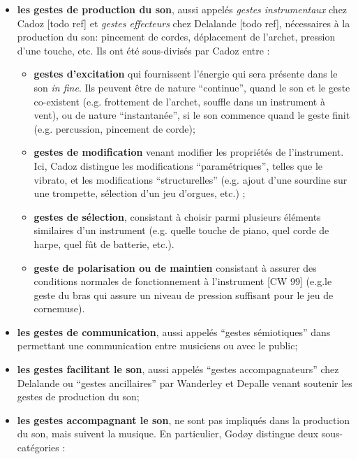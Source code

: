 \vspace{-1em}
\begin{itemize}[noitemsep]
\item \textbf{les gestes de production du son}, aussi appelés \textit{gestes instrumentaux} chez Cadoz [todo ref] et \textit{gestes effecteurs} chez Delalande [todo ref], nécessaires à la production du son: pincement de cordes, déplacement de l'archet, pression d'une touche, etc. Ils ont été sous-divisés par Cadoz \cite{cadoz_instrumental_1988} entre :
	\vspace{-0.5em}
	\begin{itemize}[noitemsep]
		\item \textbf{gestes d'excitation} qui fournissent l'énergie qui sera présente dans le son \textit{in fine}. Ils peuvent être de nature ``continue'', quand le son et le geste co-existent (e.g. frottement de l'archet, souffle dans un instrument à vent), ou de nature ``instantanée'', si le son commence quand le geste finit (e.g. percussion, pincement de corde);
		\item \textbf{gestes de modification} venant modifier les propriétés de l'instrument. Ici, Cadoz distingue les modifications ``paramétriques'', telles que le vibrato, et les modifications ``structurelles'' (e.g. ajout d'une sourdine sur une trompette, sélection d'un jeu d'orgues, etc.) ;
		\item \textbf{gestes de sélection}, consistant à choisir parmi plusieurs éléments similaires d'un instrument (e.g. quelle touche de piano, quel corde de harpe, quel fût de batterie, etc.).
		\item \textbf{geste de polarisation ou de maintien} consistant à assurer des conditions normales de fonctionnement à l'instrument [CW 99] (e.g.le geste du bras qui assure un niveau de pression suffisant pour le jeu de cornemuse).
	\end{itemize}
\item \textbf{les gestes de communication}, aussi appelés ``gestes sémiotiques'' dans \cite{cadoz_gesture_2000} permettant une communication entre musiciens ou avec le public;
\item \textbf{les gestes facilitant le son}, aussi appelés ``gestes accompagnateurs'' chez Delalande \cite{delalande_geste_1988} ou ``gestes ancillaires'' par Wanderley et Depalle \cite{wanderley_gestural_2004} venant soutenir les gestes de production du son;
\item \textbf{les gestes accompagnant le son}, ne sont pas impliqués dans la production du son, mais suivent la musique. En particulier, Godøy distingue deux sous-catégories :

\end{itemize}
